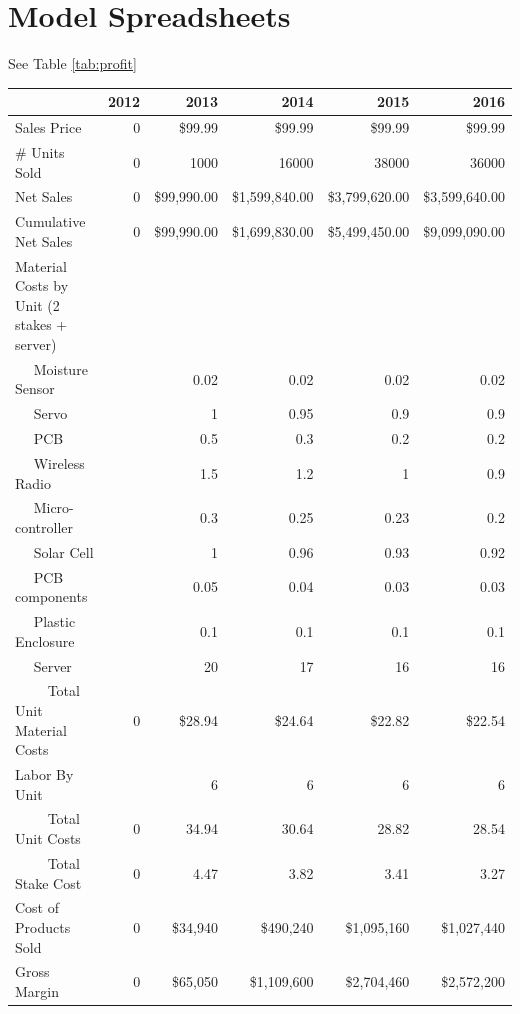 \documentclass[11pt]{article}
\begin{document}
\section{Model Spreadsheets}
See Table \ref{tab:profit}


\begin{table}
\begin{tabular}{l||r|r|r|r|r}
&2012&2013&2014&2015&2016\\
 \hline 
Sales Price &0&\$99.99 &\$99.99 &\$99.99 &\$99.99 \\
\# Units Sold &0&1000&16000&38000&36000\\
\hline
Net Sales &0&\$99,990.00 &\$1,599,840.00 &\$3,799,620.00 &\$3,599,640.00 \\
\hline 
Cumulative Net Sales &0&\$99,990.00 &\$1,699,830.00 &\$5,499,450.00 &\$9,099,090.00 \\
\hline
Material Costs by Unit (2 stakes + server)&  &  &  &  &\\
~~ Moisture Sensor &  &0.02&0.02&0.02&0.02\\
~~ Servo &  &1&0.95&0.9&0.9\\
~~ PCB &  &0.5&0.3&0.2&0.2\\
~~ Wireless Radio &  &1.5&1.2&1&0.9\\
~~ Micro-controller &  &0.3&0.25&0.23&0.2\\
~~ Solar Cell &  &1&0.96&0.93&0.92\\
~~ PCB components &  &0.05&0.04&0.03&0.03\\
~~ Plastic Enclosure &&0.1&0.1&0.1&0.1\\
~~ Server &  &20 &17&16&16\\
~~~~ Total Unit Material Costs &0&\$28.94 &\$24.64 &\$22.82 &\$22.54 \\
Labor By Unit &  &6&6&6&6\\
~~~~ Total Unit Costs &0& 34.94&30.64&28.82&28.54\\
~~~~ Total Stake Cost&0&4.47&3.82&3.41&3.27\\
\hline 
Cost of Products Sold &0&\$34,940&\$490,240&\$1,095,160&\$1,027,440\\
Gross Margin &0&\$65,050 &\$1,109,600 &\$2,704,460 &\$2,572,200 \\

\end{tabular}
\end{table}
\end{document}

